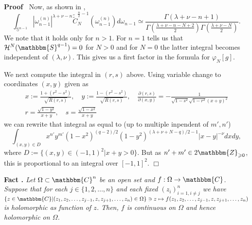 \documentclass{article}
\newcommand{\assign}{:=}
\newcommand{\tmtextbf}[1]{{\bfseries{#1}}}
\newcommand{\tmtextit}[1]{{\itshape{#1}}}
\newcommand{\tmtextup}[1]{{\upshape{#1}}}
\newenvironment{proof}{\noindent\textbf{Proof\ }}{\hspace*{\fill}$\Box$\medskip}
\numberwithin{definition}{section}
\numberwithin{lemma}{section}
\numberwithin{proposition}{section}
{\theorembodyfont{\rmfamily}\newtheorem{remark}{Remark}
\numberwithin{remark}{section}
}
\begin{document}
\begin{proof}
  Now, as shown in {\cite[lem. 7.6]{kobayashi2015symmetry}},
  \[ \int_{\mathbb{S}^{n - 1}} | \omega_{n - 1}^{(n)} |^{\lambda + \nu - n} 
     \widetilde{\tilde{C}}_N^{\frac{n}{2} - 1} (\omega_{n - 1}^{(n)}) d
     \omega_{n - 1} \simeq \frac{\Gamma ( \lambda + \nu - n + 1)}{\Gamma
     \left( \frac{\lambda + \nu - n - N + 2}{2} \right) \Gamma \left(
     \frac{\lambda + \nu - N}{2} \right)} . \]
  We note that it holds only for $n > 1$. For $n = 1$ {\cite[p.
  6]{howe1993homogeneous}} tells us that $\mathcal{H}^N ( \mathbbm{S}^{q - 1})
  = 0$ for $N > 0$ and for $N = 0$ the latter integral becomes independent of
  $( \lambda, \nu)$. This gives us a first factor in the formula for
  $\varphi_N [ g]$.
  
  We next compute the integral in $( r, s)$ above. Using variable change to
  coordinates $(x, y)$ given as
  \begin{eqnarray}
    & x \assign \frac{1 + (r^2 - s^2)}{\sqrt{R (r, s)}}, \hspace{1em} y
    \assign \frac{1 - (r^2 - s^2)}{\sqrt{R (r, s)}}, \hspace{1em}
    \frac{\partial ( r, s)}{\partial ( x, y)} = - \frac{1}{\sqrt{1 - s^2}
    \sqrt{1 - r^2} ( x + y)^2} &  \nonumber\\
    & r = \frac{\sqrt{1 - y^2}}{x + y}, \hspace{1em} s = \frac{\sqrt{1 -
    x^2}}{x + y} &  \nonumber
  \end{eqnarray}
  we can rewrite that integral as equal to (up to multiple inpendent of $m',
  n'$)
  \[ \int_{( x, y) \in D} x^{n'} y^{m'} ( 1 - x^2)^{( q - 2) / 2} ( 1 -
     y^2)^{( \lambda + \nu + N - q) / 2 - 1} | x - y |^{- \nu} d x d y, \]
  where $D \assign \{ ( x, y) \in ( - 1, 1)^2 | x + y > 0 \}$. But as $n' + m'
  \in 2\mathbbm{Z}_{\geqslant 0}$, this is proportional to an integral over $[
  - 1, 1]^2$.
\end{proof}

{\noindent}\tmtextbf{Fact \tmtextup{19}.
}\tmtextit{\label{k-finite:fact-hartogs}{\cite[thm.
1.2.5]{krantz1982function}} Let $\Omega \subset \mathbbm{C}^n$ be an open set
and $f : \Omega \rightarrow \mathbbm{C}$. Suppose that for each $j \in \{ 1,
2, \ldots, n \}$ and each fixed $( z_i)_{i = 1, i \neq j}^n$ we have $\{ z \in
\mathbbm{C} | ( z_1, z_2, \ldots, z_{j - 1}, z, z_{j + 1}, \ldots, z_n) \in
\Omega \} \ni z \mapsto f ( z_1, z_2, \ldots, z_{j - 1}, z, z_{j + 1}, \ldots,
z_n)$ is holomorphic as function of $z$. Then, $f$ is continuous on $\Omega$
and hence holomorphic on $\Omega$.}{\hspace*{\fill}}{\medskip}
\end{document}
